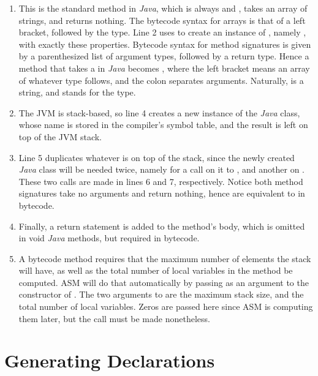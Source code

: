 \begin{enumerate}
	\addtocounter{enumi}{1}
	\item This is the standard  method in \emph{Java}, which is always  and , takes an array of strings, and returns nothing. The bytecode syntax for arrays is that of a left bracket, followed by the type. Line 2 uses  to create an instance of , namely , with exactly these properties. Bytecode syntax for method signatures is given by a parenthesized list of argument types, followed by a return type. Hence a  method that takes a  in \emph{Java} becomes \il{([Ljava/lang/String;)V}, where the left bracket means an array of whatever type follows, and the colon separates arguments. Naturally,  is a string, and  stands for the  type.
	\addtocounter{enumi}{1}
	\item The JVM is stack-based, so line 4 creates a new instance of the \emph{Java} class, whose name is stored in the compiler's symbol table, and the result is left on top of the JVM stack.
	\item Line 5 duplicates whatever is on top of the stack, since the newly created \emph{Java} class will be needed twice, namely for a call on it to , and another on . These two calls are made in lines 6 and 7, respectively. Notice both method signatures take no arguments and return nothing, hence are equivalent to  in bytecode.
	\addtocounter{enumi}{2}
	\item Finally, a return statement is added to the  method's body, which is omitted in void \emph{Java} methods, but required in bytecode.
	\item A bytecode method requires that the maximum number of elements the stack will have, as well as the total number of local variables in the method be computed. ASM will do that automatically by passing  as an argument to the constructor of . The two arguments to  are the maximum stack size, and the total number of local variables. Zeros are passed here since ASM is computing them later, but the call must be made nonetheless.
\end{enumerate}

\section{Generating Declarations}

